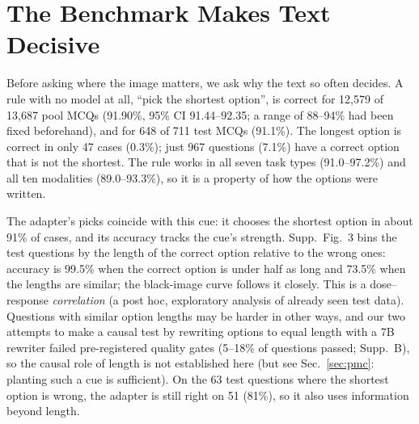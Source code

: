 \section{The Benchmark Makes Text Decisive}
\label{sec:shortcut}

Before asking where the image matters, we ask why the text so often decides.
A rule with no model at all, ``pick the shortest option'', is correct for 12{,}579 of 13{,}687 pool MCQs (91.90\%, 95\% CI 91.44--92.35; a range of 88--94\% had been fixed beforehand), and for 648 of 711 test MCQs (91.1\%).
The longest option is correct in only 47 cases (0.3\%); just 967 questions (7.1\%) have a correct option that is not the shortest.
The rule works in all seven task types (91.0--97.2\%) and all ten modalities (89.0--93.3\%), so it is a property of how the options were written.

The adapter's picks coincide with this cue: it chooses the shortest option in about 91\% of cases, and its accuracy tracks the cue's strength.
Supp.~Fig.~3 bins the test questions by the length of the correct option relative to the wrong ones: accuracy is 99.5\% when the correct option is under half as long and 73.5\% when the lengths are similar; the black-image curve follows it closely.
This is a dose--response \emph{correlation} (a post hoc, exploratory analysis of already seen test data).
Questions with similar option lengths may be harder in other ways, and our two attempts to make a causal test by rewriting options to equal length with a 7B rewriter failed pre-registered quality gates (5--18\% of questions passed; Supp.~B), so the causal role of length is not established here (but see Sec.~\ref{sec:pmc}: planting such a cue is sufficient).
On the 63 test questions where the shortest option is wrong, the adapter is still right on 51 (81\%), so it also uses information beyond length.
